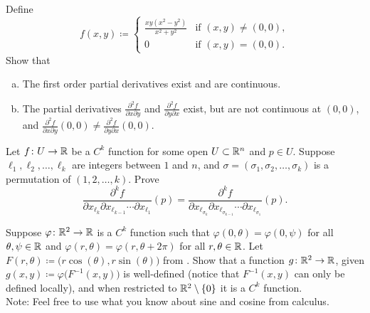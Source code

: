 \begin{exercise} \label{exercise:mixedpartialsunequal}
Define
\begin{equation*}
f(x,y) \coloneqq
\begin{cases}
\frac{xy(x^2-y^2)}{x^2+y^2} & \text{if } (x,y) \not= (0,0),\\
0                           & \text{if } (x,y) = (0,0).
\end{cases}
\end{equation*}
Show that
\begin{enumerate}[a)]
\item
The first order partial derivatives exist and are continuous.
\item
The partial derivatives
$\frac{\partial^2 f}{\partial x \partial y}$ and
$\frac{\partial^2 f}{\partial y \partial x}$ exist, but are not continuous
at $(0,0)$, and
$\frac{\partial^2 f}{\partial x \partial y}(0,0) \not= 
\frac{\partial^2 f}{\partial y \partial x}(0,0)$.
\end{enumerate}
\end{exercise}

\begin{exercise}
Let $f \colon U \to {\mathbb{R}}$ be a $C^k$ function for some open $U \subset {\mathbb{R}}^n$
and $p \in U$.
Suppose ${\ell}_1,{\ell}_2,\ldots,{\ell}_k$ are integers between $1$
and $n$, and $\sigma=(\sigma_1,\sigma_2,\ldots,\sigma_k)$ is a
permutation of $(1,2,\ldots,k)$.  Prove
\begin{equation*}
\frac{\partial^{k} f}{\partial x_{{\ell}_{k}} \partial x_{{\ell}_{k-1}}
\cdots \partial x_{{\ell}_1}} (p)
=
\frac{\partial^{k} f}{\partial x_{{\ell}_{\sigma_k}} \partial
x_{{\ell}_{\sigma_{k-1}}}
\cdots \partial x_{{\ell}_{\sigma_1}}} (p) .
\end{equation*}
\end{exercise}

\begin{exercise}
Suppose $\varphi \colon {\mathbb{R}}^2 \to {\mathbb{R}}$ is a $C^k$ function
such that
$\varphi(0,\theta) = \varphi(0,\psi)$ for all $\theta,\psi \in {\mathbb{R}}$
and
$\varphi(r,\theta) = \varphi(r,\theta+2\pi)$ for all $r,\theta \in {\mathbb{R}}$.
Let $F(r,\theta) \coloneqq \bigl(r \cos(\theta), r \sin(\theta) \bigr)$ from 
.  Show that a function
$g \colon {\mathbb{R}}^2 \to {\mathbb{R}}$, given
$g(x,y) \coloneqq \varphi \bigl(F^{-1}(x,y)\bigr)$ is well-defined (notice that
$F^{-1}(x,y)$ can only be defined locally), and
when restricted to ${\mathbb{R}}^2 \setminus \{ 0 \}$ it is a $C^k$ function.
\\
Note: Feel free to use what you know about sine and cosine from calculus.
\end{exercise}

